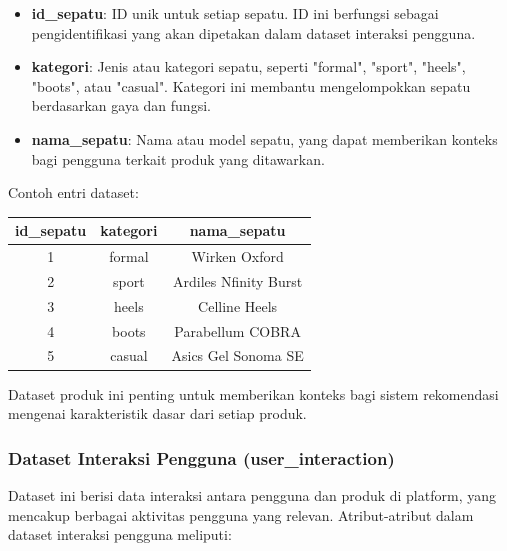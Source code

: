 \documentclass[journal,article,submit,pdftex,moreauthors]{Definitions/mdpi}
\begin{document}
\begin{itemize}
    \item \textbf{id\_sepatu}: ID unik untuk setiap sepatu. ID ini berfungsi sebagai pengidentifikasi yang akan dipetakan dalam dataset interaksi pengguna.
    \item \textbf{kategori}: Jenis atau kategori sepatu, seperti "formal", "sport", "heels", "boots", atau "casual". Kategori ini membantu mengelompokkan sepatu berdasarkan gaya dan fungsi.
    \item \textbf{nama\_sepatu}: Nama atau model sepatu, yang dapat memberikan konteks bagi pengguna terkait produk yang ditawarkan.
\end{itemize}

Contoh entri dataset:

\begin{table}[h]
\centering
\begin{tabular}{|c|c|c|}
\hline
\textbf{id\_sepatu} & \textbf{kategori} & \textbf{nama\_sepatu} \\ \hline
1 & formal & Wirken Oxford \\ \hline
2 & sport & Ardiles Nfinity Burst \\ \hline
3 & heels & Celline Heels \\ \hline
4 & boots & Parabellum COBRA \\ \hline
5 & casual & Asics Gel Sonoma SE \\ \hline
\end{tabular}
\end{table}

Dataset produk ini penting untuk memberikan konteks bagi sistem rekomendasi mengenai karakteristik dasar dari setiap produk.

\subsubsection{Dataset Interaksi Pengguna (user\_interaction)}
Dataset ini berisi data interaksi antara pengguna dan produk di platform, yang mencakup berbagai aktivitas pengguna yang relevan. Atribut-atribut dalam dataset interaksi pengguna meliputi:
\end{document}
